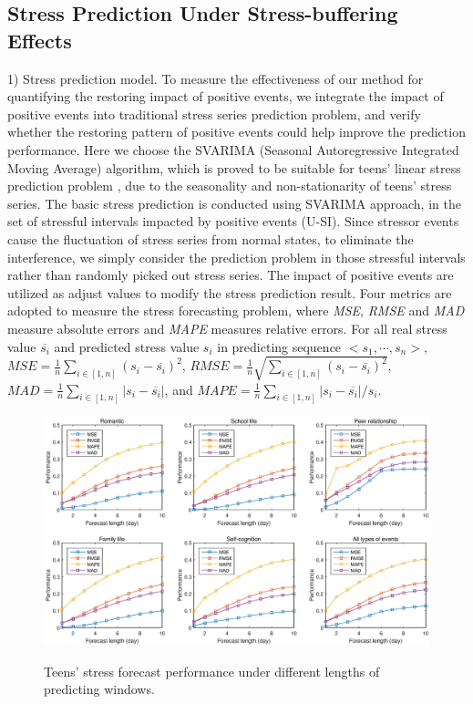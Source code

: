 \subsection{Stress Prediction Under Stress-buffering Effects}
\label{subsec:predict}
1) Stress prediction model.
To measure the effectiveness of our method for quantifying the restoring impact of positive events,
we integrate the impact of positive events into traditional stress series prediction problem,
and verify whether the restoring pattern of positive events could help improve the prediction performance.
Here we choose the SVARIMA (Seasonal Autoregressive Integrated Moving Average) algorithm,
which is proved to be suitable for teens' linear stress prediction problem \citep{Shumway2006Time, Li2015Predicting},
due to the seasonality and non-stationarity of teens' stress series.
The basic stress prediction is conducted using SVARIMA approach,
in the set of stressful intervals impacted by positive events (U-SI).
Since stressor events cause the fluctuation of stress series from normal states,
to eliminate the interference,
we simply consider the prediction problem in those stressful intervals rather than randomly picked out stress series.
The impact of positive events are utilized as adjust values to modify the stress prediction result.
Four metrics are adopted to measure the stress forecasting problem,
where \emph{MSE}, \emph{RMSE} and \emph{MAD} measure absolute errors and \emph{MAPE} measures relative errors.
For all real stress value $\overline{s_i}$ and predicted stress value $s_i$ in predicting sequence $<s_1,\cdots,s_n>$,
$MSE = \frac{1}{n}\sum_{i\in[1,n]}(s_i-\overline{s_i})^2$,
$RMSE = \frac{1}{n}\sqrt{\sum_{i\in[1,n]}(s_i-\overline{s_i})^2}$,
$MAD = \frac{1}{n}\sum_{i\in[1,n]}|s_i-\overline{s_i}|$,
and $MAPE = \frac{1}{n}\sum_{i\in[1,n]}{|s_i-\overline{s_i}|/s_i}$.

\begin{figure}
\centering
\caption{Teens' stress forecast performance under different lengths of predicting windows.}
\includegraphics[width=\linewidth]{figs/predictWindow2.eps}
\label{fig:length}
\end{figure}

